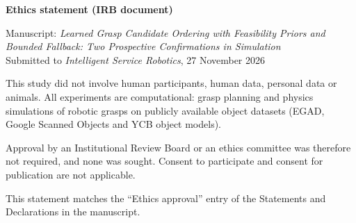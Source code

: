\documentclass[11pt,a4paper]{article}
\begin{document}
\pagestyle{empty}

\begin{center}
{\large\bfseries Ethics statement (IRB document)\par}
\medskip
Manuscript: \emph{Learned Grasp Candidate Ordering with Feasibility Priors and Bounded Fallback: Two Prospective Confirmations in Simulation}\\
Submitted to \emph{Intelligent Service Robotics}, 27 November 2026
\end{center}

\bigskip
\noindent This study did not involve human participants, human data, personal data or animals. All experiments are computational: grasp planning and physics simulations of robotic grasps on publicly available object datasets (EGAD, Google Scanned Objects and YCB object models).

\medskip
\noindent Approval by an Institutional Review Board or an ethics committee was therefore not required, and none was sought. Consent to participate and consent for publication are not applicable.

\medskip
\noindent This statement matches the ``Ethics approval'' entry of the Statements and Declarations in the manuscript.
\end{document}
